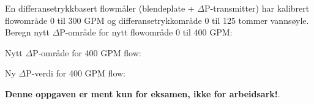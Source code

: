 

En differansetrykkbasert flowmåler (blendeplate + $\Delta$P-transmitter) har kalibrert flowområde 0 til 300 GPM og differansetrykkområde 0 til 125 tommer vannsøyle. Beregn nytt $\Delta$P-område for nytt flowområde 0 til 400 GPM:

\vskip 10pt

Nytt $\Delta$P-område for 400 GPM flow: \underbar{\hskip 50pt}







Ny $\Delta$P-verdi for 400 GPM flow: 







{\bf Denne oppgaven er ment kun for eksamen, ikke for arbeidsark!}.


